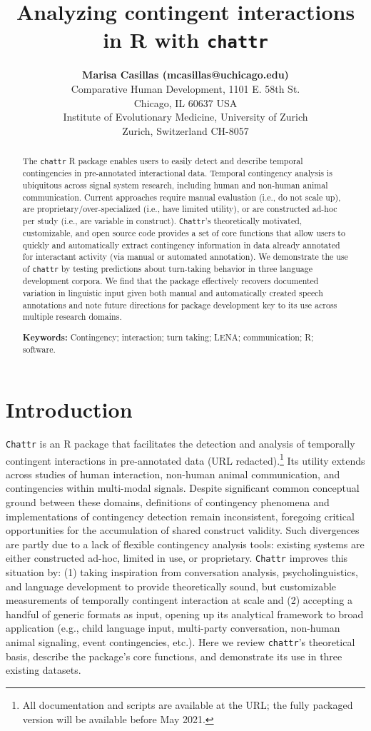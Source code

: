 \documentclass[10pt, letterpaper]{article}
\title{Analyzing contingent interactions in R with \texttt{chattr}}
\author{{\large \bf Marisa Casillas (mcasillas@uchicago.edu)} \\ Comparative Human Development, 1101 E. 58th St. \\ Chicago, IL 60637 USA \AND {\large \bf Camila Scaff (camila.scaff@iem.uzh.ch)} \\ Institute of Evolutionary Medicine, University of Zurich \\ Zurich, Switzerland CH-8057}
\begin{document}
\maketitle

\begin{abstract}
The \texttt{chattr} R package enables users to easily detect and
describe temporal contingencies in pre-annotated interactional data.
Temporal contingency analysis is ubiquitous across signal system
research, including human and non-human animal communication. Current
approaches require manual evaluation (i.e., do not scale up), are
proprietary/over-specialized (i.e., have limited utility), or are
constructed ad-hoc per study (i.e., are variable in construct).
\texttt{Chattr}'s theoretically motivated, customizable, and open source
code provides a set of core functions that allow users to quickly and
automatically extract contingency information in data already annotated
for interactant activity (via manual or automated annotation). We
demonstrate the use of \texttt{chattr} by testing predictions about
turn-taking behavior in three language development corpora. We find that
the package effectively recovers documented variation in linguistic
input given both manual and automatically created speech annotations and
note future directions for package development key to its use across
multiple research domains.

\textbf{Keywords:}
Contingency; interaction; turn taking; LENA; communication; R; software.
\end{abstract}

\hypertarget{introduction}{%
\section{Introduction}\label{introduction}}

\texttt{Chattr} is an R package that facilitates the detection and
analysis of temporally contingent interactions in pre-annotated data
(URL redacted).\footnote{All documentation and scripts are available at
  the URL; the fully packaged version will be available before May 2021.}
Its utility extends across studies of human interaction, non-human
animal communication, and contingencies within multi-modal signals.
Despite significant common conceptual ground between these domains,
definitions of contingency phenomena and implementations of contingency
detection remain inconsistent, foregoing critical opportunities for the
accumulation of shared construct validity. Such divergences are partly
due to a lack of flexible contingency analysis tools: existing systems
are either constructed ad-hoc, limited in use, or proprietary.
\texttt{Chattr} improves this situation by: (1) taking inspiration from
conversation analysis, psycholinguistics, and language development to
provide theoretically sound, but customizable measurements of temporally
contingent interaction at scale and (2) accepting a handful of generic
formats as input, opening up its analytical framework to broad
application (e.g., child language input, multi-party conversation,
non-human animal signaling, event contingencies, etc.). Here we review
\texttt{chattr}'s theoretical basis, describe the package's core
functions, and demonstrate its use in three existing datasets.
\end{document}
